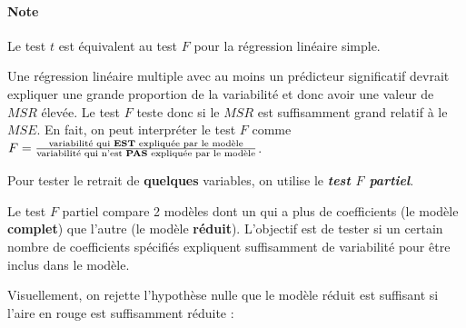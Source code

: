 \documentclass[french]{article}
\begin{document}
\begin{multicols*}{2}
\paragraph{Note}	Le test $t$ est équivalent au test $F$ pour la régression linéaire simple.

\bigskip

\begin{rappel_enhanced}[Contexte]
Une régression linéaire multiple avec au moins un prédicteur significatif devrait expliquer une grande proportion de la variabilité et donc avoir une valeur de $MSR$ élevée. Le test $F$ teste donc si le $MSR$ est suffisamment grand relatif à le $MSE$. En fait, on peut interpréter le test $F$ comme $F = \frac{\text{variabilité qui \textbf{EST} expliquée par le modèle}}{\text{variabilité qui n'est \textbf{PAS} expliquée par le modèle}}$.

\bigskip

Pour tester le retrait de \textbf{quelques} variables, on utilise le \textbf{\textit{test $F$ partiel}}.
\end{rappel_enhanced}


\begin{definitionNOHFILL}
Le test $F$ partiel compare 2 modèles dont un qui a plus de coefficients (le modèle \textbf{complet}) que l'autre (le modèle \textbf{réduit}). L'objectif est de tester si un certain nombre de coefficients spécifiés expliquent suffisamment de variabilité pour être inclus dans le modèle.

\bigskip

Visuellement, on rejette l'hypothèse nulle que le modèle réduit est suffisant si l'aire en rouge est suffisamment réduite : 

\begin{center}
\end{center}
\end{definitionNOHFILL}
\end{multicols*}
\end{document}
